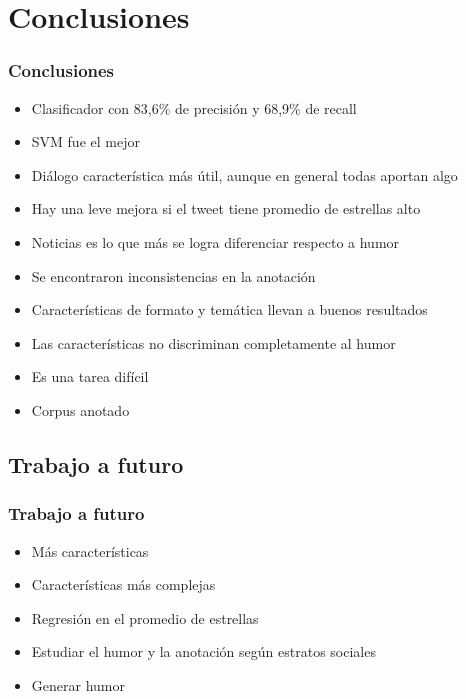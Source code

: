 \section{Conclusiones}

\begin{frame}
    \frametitle{Conclusiones}
    
    \begin{itemize}
    	\item[\checkmark] Clasificador con 83,6\% de precisión y 68,9\% de recall
    	\item[\checkmark] SVM fue el mejor
    	\item[\checkmark] Diálogo característica más útil, aunque en general todas aportan algo
    	\item[\checkmark] Hay una leve mejora si el tweet tiene promedio de estrellas alto
    	\item[\checkmark] Noticias es lo que más se logra diferenciar respecto a humor
    	\item[\checkmark] Se encontraron inconsistencias en la anotación
        \item[\checkmark] Características de formato y temática llevan a buenos resultados
    	\item[\checkmark] Las características no discriminan completamente al humor
    	\item[\checkmark] Es una tarea difícil
        \item[\checkmark] Corpus anotado
    \end{itemize}
\end{frame}

\subsection{Trabajo a futuro}
\begin{frame}
    \frametitle{Trabajo a futuro}
    
    \begin{itemize}
        \item Más características
    	\item Características más complejas
    	\item Regresión en el promedio de estrellas
    	\item Estudiar el humor y la anotación según estratos sociales
        \item Generar humor
    \end{itemize}
\end{frame}
